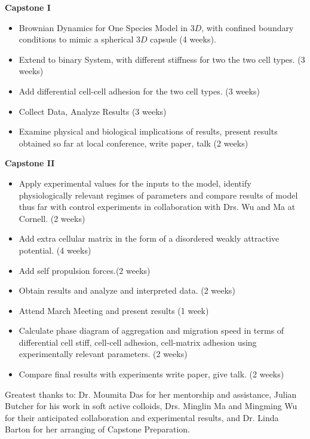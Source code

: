 \documentclass[aps,prb,twocolumn,groupedaddress,nofootinbib,floatfix]{revtex4}
\begin{document}
{\bf Capstone I}
\begin{itemize}\itemsep1pt \parskip0pt 
\item Brownian Dynamics for One Species Model in $3D$, with confined boundary conditions to mimic a spherical $3D$ capsule (4 weeks).
\item Extend to binary System, with different stiffness for two the two cell types. (3 weeks)
\item Add differential cell-cell adhesion for the two cell types. (3 weeks) 
\item Collect Data, Analyze Results (3 weeks)
\item Examine physical and biological implications of results, present results obtained so far 
at local conference, write paper, talk (2 weeks)
\end{itemize}
{\bf Capstone II} 
\begin{itemize}\itemsep1pt \parskip0pt
\item Apply experimental values for the inputs to the model, identify physiologically relevant regimes of parameters
and compare results of model thus far with control experiments in collaboration with Drs. Wu and Ma at Cornell. (2 weeks) 
\item Add extra cellular matrix in the form of a disordered weakly attractive potential. (4 weeks) 
\item Add self propulsion forces.(2 weeks)
\item Obtain results and analyze and interpreted  data. (2 weeks)
\item Attend March Meeting and present results (1 week)
\item Calculate phase diagram of aggregation and migration speed in terms of differential 
cell stiff, cell-cell adhesion, cell-matrix adhesion using experimentally relevant parameters. (2 weeks)
 \item Compare final results with experiments  write paper, give talk. (2 weeks)
\end{itemize}

\begin{acknowledgments}
Greatest thanks to: Dr. Moumita Das for her mentorship and assistance, Julian Butcher for his work in soft active colloids, Drs. Minglin Ma and Mingming Wu for their anticipated collaboration and experimental results, and Dr. Linda Barton for her arranging of Capstone Preparation.
\end{acknowledgments}

\vspace{0.6in}
%
%



\end{document}
